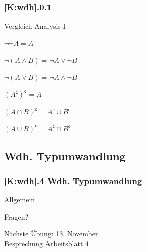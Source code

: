 \documentclass[c,18pt]{beamer}
\begin{document}
\subsection{\stitle}\label{S:Morgansche}
\begin{frame}[fragile]%
  \frametitle{\ref{K:wdh}.\ref{S:Morgansche} \stitle}%
Vergleich Analysis I
\medskip

\begin{description}
  \item[und bzw. oder]
  \item $\neg \neg A = A$
  \item $\neg (A \wedge B) = \neg A \vee \neg B$
  \item $\neg (A \vee B) = \neg A \wedge \neg B$
\end{description}
\medskip

\begin{description}
  \item[Schnittmenge bzw. Vereinigung]
  \item $(A^{\mathsf{c}})^{\mathsf{c}} = A$
  \item $(A \cap B)^{\mathsf{c}} = A^{\mathsf{c}} \cup B^{\mathsf{c}}$
  \item $(A \cup B)^{\mathsf{c}} = A^{\mathsf{c}} \cap B^{\mathsf{c}}$
\end{description}

\end{frame}

\setcounter{exercise}{8}


\setcounter{exercise}{9}


\def\stitle{Wdh. Typumwandlung}
\subsection{\stitle}\label{S:Typumwandlung}
\begin{frame}[fragile]%
  \frametitle{\ref{K:wdh}.4 \stitle}%
\medskip

Allgemein .


\end{frame}
\setcounter{exercise}{10}

\setcounter{exercise}{11}

\setcounter{exercise}{12}



\begin{frame}
\centering
\Huge\textcolor{KITgreen}{Fragen?}
\vspace{2cm}

{\LARGE
Nächste Übung: 13. November\\
Besprechung Arbeitsblatt 4
}
\end{frame}


\end{document}
